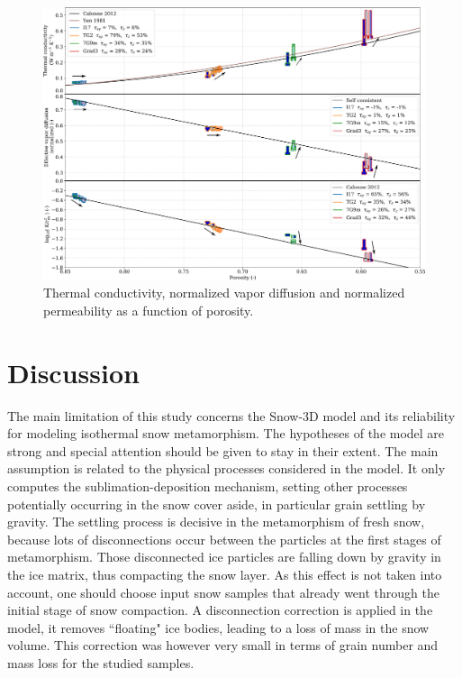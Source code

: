 \documentclass[draft,ms]{agujournal2019}
\begin{document}
\begin{figure}
    \centering
    \includegraphics[width=\linewidth]{Figures/Tplot_tau.pdf}
    \caption{Thermal conductivity, normalized vapor diffusion and normalized permeability as a function of porosity.}
    \label{fig:Tplot}
\end{figure}
\section{Discussion}

The main limitation of this study concerns the Snow-3D model and its reliability for modeling isothermal snow metamorphism. The hypotheses of the model are strong and special attention should be given to stay in their extent. The main assumption is related to the physical processes considered in the model. It only computes the sublimation-deposition mechanism, setting other processes potentially occurring in the snow cover aside, in particular grain settling by gravity. The settling process is decisive in the metamorphism of fresh snow, because lots of disconnections occur between the particles at the first stages of metamorphism. Those disconnected ice particles are falling down by gravity in the ice matrix, thus compacting the snow layer. As this effect is not taken into account, one should choose input snow samples that already went through the initial stage of snow compaction. A disconnection correction is applied in the model, it removes ``floating" ice bodies, leading to a loss of mass in the snow volume. This correction was however very small in terms of grain number and mass loss for the studied samples.\\
\end{document}
